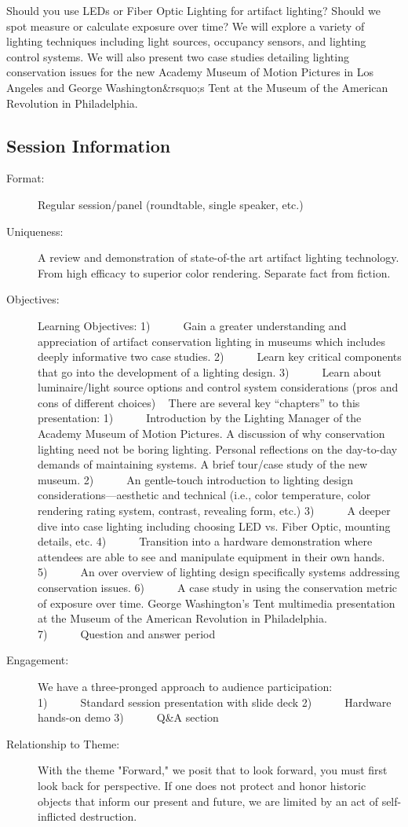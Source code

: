 \documentclass{report}
\begin{document}
              Should you use LEDs or Fiber Optic Lighting for artifact lighting? Should we spot measure or calculate exposure over time? We will explore a variety of lighting techniques including light sources, occupancy sensors, and lighting control systems. We will also present two case studies detailing lighting conservation issues for the new Academy Museum of Motion Pictures in Los Angeles and George Washington\&rsquo;s Tent at the Museum of the American Revolution in Philadelphia.

              \subsection*{Session Information}
                \begin{description}
                  \item [Format:] Regular session/panel (roundtable, single speaker, etc.)
							    
							    \item [Uniqueness:]A review and demonstration of state-of-the art artifact lighting technology. From high efficacy to superior color rendering. Separate fact from fiction.
							    \item [Objectives:]Learning Objectives:
1)      Gain a greater understanding and appreciation of artifact conservation lighting in museums which includes deeply informative two case studies.
2)      Learn key critical components that go into the development of a lighting design.
3)      Learn about luminaire/light source options and control system considerations (pros and cons of different choices)
 
There are several key “chapters” to this presentation:
1)      Introduction by the Lighting Manager of the Academy Museum of Motion Pictures. A discussion of why conservation lighting need not be boring lighting. Personal reflections on the day-to-day demands of maintaining systems. A brief tour/case study of the new museum.
2)      An gentle-touch introduction to lighting design considerations—aesthetic and technical (i.e., color temperature, color rendering rating system, contrast, revealing form, etc.)
3)      A deeper dive into case lighting including choosing LED vs. Fiber Optic, mounting details, etc.
4)      Transition into a hardware demonstration where attendees are able to see and manipulate equipment in their own hands.
5)      An over overview of lighting design specifically systems addressing conservation issues.
6)      A case study in using the conservation metric of exposure over time. George Washington’s Tent multimedia presentation at the Museum of the American Revolution in Philadelphia.
7)      Question and answer period
							    \item [Engagement:]We have a three-pronged approach to audience participation:
1)      Standard session presentation with slide deck
2)      Hardware hands-on demo
3)      Q\&A section
							    \item [Relationship to Theme:]With the theme "Forward," we posit that to look forward, you must first look back for perspective. If one does not protect and honor historic objects that inform our present and future, we are limited by an act of self-inflicted destruction.


\end{description}
\end{document}
